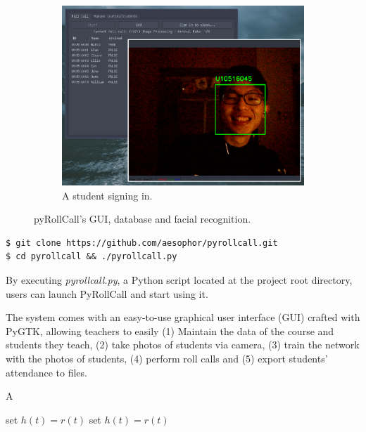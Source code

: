 \begin{figure}[!htb]
\begin{subfigure}[b]{0.32\linewidth}
    \includegraphics[width=\linewidth]{figures/preview3.eps}
    \caption{A student signing in.}
  \end{subfigure}
  \caption{pyRollCall's GUI, database and facial recognition.}
  \label{fig:implementation}
\end{figure}


\begin{lstlisting}[numbers=none,xleftmargin=0em,caption={Shell commands to checkout and run PyRollCall}]
$ git clone https://github.com/aesophor/pyrollcall.git
$ cd pyrollcall && ./pyrollcall.py 
\end{lstlisting}

By executing \emph{pyrollcall.py}, a Python script located at the project root directory,
users can launch PyRollCall and start using it.

The system comes with an easy-to-use graphical user interface (GUI) crafted with PyGTK,
allowing teachers to easily
(1) Maintain the data of the course and students they teach,
(2) take photos of students via camera,
(3) train the network with the photos of students,
(4) perform roll calls and
(5) export students' attendance to files.

\begin{algorithm}  
\caption{A}  
\label{alg:A}  
\begin{algorithmic}  
\REPEAT   
\STATE set $h(t)=r(t)$   
\REPEAT  
\STATE set $h(t)=r(t)$   
\end{algorithmic}  
\end{algorithm}  
